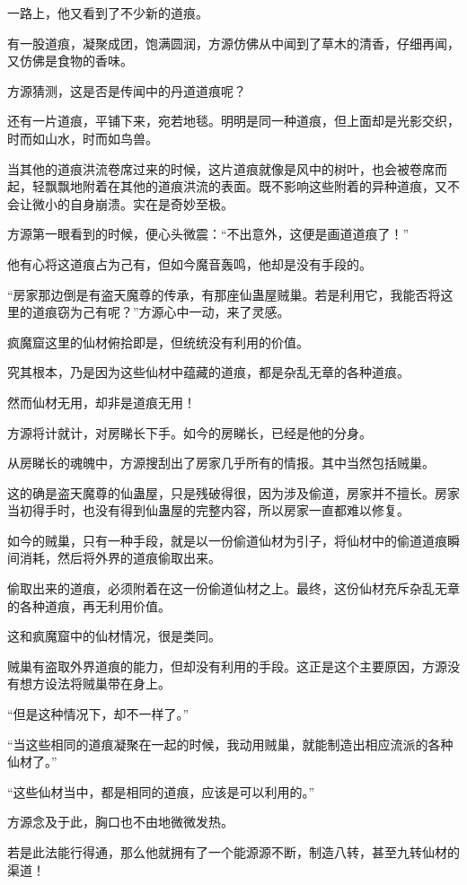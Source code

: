 \begin{this_body}
一路上，他又看到了不少新的道痕。

有一股道痕，凝聚成团，饱满圆润，方源仿佛从中闻到了草木的清香，仔细再闻，又仿佛是食物的香味。

方源猜测，这是否是传闻中的丹道道痕呢？

还有一片道痕，平铺下来，宛若地毯。明明是同一种道痕，但上面却是光影交织，时而如山水，时而如鸟兽。

当其他的道痕洪流卷席过来的时候，这片道痕就像是风中的树叶，也会被卷席而起，轻飘飘地附着在其他的道痕洪流的表面。既不影响这些附着的异种道痕，又不会让微小的自身崩溃。实在是奇妙至极。

方源第一眼看到的时候，便心头微震：“不出意外，这便是画道道痕了！”

他有心将这道痕占为己有，但如今魔音轰鸣，他却是没有手段的。

“房家那边倒是有盗天魔尊的传承，有那座仙蛊屋贼巢。若是利用它，我能否将这里的道痕窃为己有呢？”方源心中一动，来了灵感。

疯魔窟这里的仙材俯拾即是，但统统没有利用的价值。

究其根本，乃是因为这些仙材中蕴藏的道痕，都是杂乱无章的各种道痕。

然而仙材无用，却非是道痕无用！

方源将计就计，对房睇长下手。如今的房睇长，已经是他的分身。

从房睇长的魂魄中，方源搜刮出了房家几乎所有的情报。其中当然包括贼巢。

这的确是盗天魔尊的仙蛊屋，只是残破得很，因为涉及偷道，房家并不擅长。房家当初得手时，也没有得到仙蛊屋的完整内容，所以房家一直都难以修复。

如今的贼巢，只有一种手段，就是以一份偷道仙材为引子，将仙材中的偷道道痕瞬间消耗，然后将外界的道痕偷取出来。

偷取出来的道痕，必须附着在这一份偷道仙材之上。最终，这份仙材充斥杂乱无章的各种道痕，再无利用价值。

这和疯魔窟中的仙材情况，很是类同。

贼巢有盗取外界道痕的能力，但却没有利用的手段。这正是这个主要原因，方源没有想方设法将贼巢带在身上。

“但是这种情况下，却不一样了。”

“当这些相同的道痕凝聚在一起的时候，我动用贼巢，就能制造出相应流派的各种仙材了。”

“这些仙材当中，都是相同的道痕，应该是可以利用的。”

方源念及于此，胸口也不由地微微发热。

若是此法能行得通，那么他就拥有了一个能源源不断，制造八转，甚至九转仙材的渠道！


\end{this_body}
